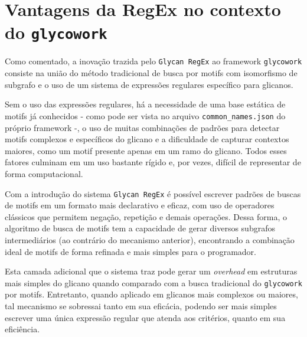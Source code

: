 \section{Vantagens da RegEx no contexto do \texttt{glycowork}}

Como comentado, a inovação trazida pelo \texttt{Glycan RegEx} ao framework
\texttt{glycowork} consiste na união do método tradicional de busca por motifs
com isomorfismo de subgrafo e o uso de um sistema de expressões regulares
específico para glicanos.

Sem o uso das expressões regulares, há a necessidade de uma base estática de
motifs já conhecidos - como pode ser vista no arquivo
\texttt{common\_names.json} do próprio framework -, o uso de muitas combinações
de padrões para detectar motifs complexos e específicos do glicano e a
dificuldade de capturar contextos maiores, como um motif presente apenas em um
ramo do glicano. Todos esses fatores culminam em um uso bastante rígido e, por
vezes, difícil de representar de forma computacional.

Com a introdução do sistema \texttt{Glycan RegEx} é possível escrever padrões
de buscas de motifs em um formato mais declarativo e eficaz, com uso de
operadores clássicos que permitem negação, repetição e demais operações. Dessa
forma, o algoritmo de busca de motifs tem a capacidade de gerar diversos
subgrafos intermediários (ao contrário do mecanismo anterior), encontrando a
combinação ideal de motifs de forma refinada e mais simples para o programador.

Esta camada adicional que o sistema traz pode gerar um \textit{overhead} em
estruturas mais simples do glicano quando comparado com a busca tradicional do
\texttt{glycowork} por motifs. Entretanto, quando aplicado em glicanos mais
complexos ou maiores, tal mecanismo se sobressai tanto em sua eficácia, podendo
ser mais simples escrever uma única expressão regular que atenda aos critérios,
quanto em sua eficiência.

